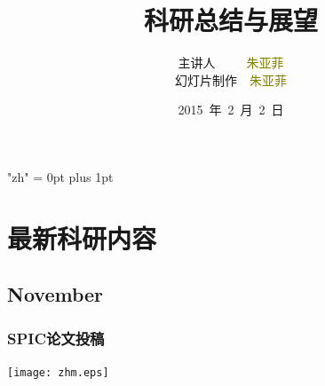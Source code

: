 \documentclass[notheorems,mathserif,table,compress]{beamer}  %
\begin{document}
\XeTeXlinebreaklocale "zh"         %
\XeTeXlinebreakskip = 0pt plus 1pt %

\title{科研总结与展望}
\author[zhu]{主讲人~~~~~\textcolor{olive}{朱亚菲}\\
    \quad 幻灯片制作~~\textcolor{olive}{朱亚菲}}
\institute[中国海洋大学]{\small\textcolor{violet}{中国海洋大学~~信息科学与工程学院}}
\date{2015~年~2~月~2~日}
\frame{ \titlepage }







\section{最新科研内容}

\subsection{November}


\begin{frame}
  \frametitle{SPIC论文投稿}
  \centering\texttt{[image: zhm.eps]}
\end{frame}
\end{document}
